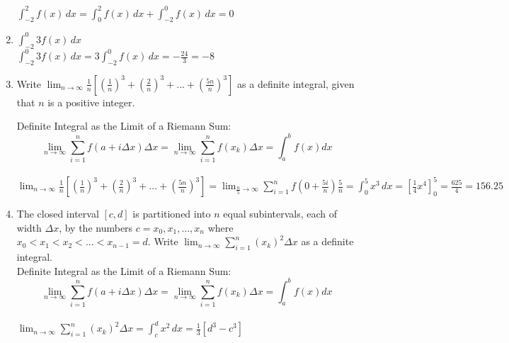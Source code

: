 \documentclass[10pt, letterpaper]{report}
\begin{document}
\begin{enumerate}
    $\int_{-2}^{2}{f(x)}\,dx=\int_{0}^{2}{f(x)}\,dx+\int_{-2}^{0}{f(x)}\,dx=0$ \\

  \item{$\int_{-2}^{0}{3f(x)}\,dx$} \\

    $\int_{-2}^{0}{3f(x)}\,dx=3\int_{-2}^{0}{f(x)}\,dx=-\frac{24}{3}=-8$ \\

\hline
  \item{Write $\lim_{n\to\infty}\frac{1}{n}[(\frac{1}{n})^{3}+(\frac{2}{n})^{3}+...+(\frac{5n}{n})^{3}]$ as a definite integral, given that $n$ is a positive integer.} \\

    \par Definite Integral as the Limit of a Riemann Sum: \\

    \[ \lim_{n\to\infty}\sum_{i=1}^{n}f(a+i\Delta x)\Delta x=\lim_{n\to\infty}\sum_{i=1}^{n}f(x_{k})\Delta x=\int_{a}^{b}f(x)dx \] \\

    $\lim_{n\to\infty}\frac{1}{n}[(\frac{1}{n})^{3}+(\frac{2}{n})^{3}+...+(\frac{5n}{n})^{3}]
    =\lim_{\frac{n}{5}\to\infty}\sum_{i=1}^{n}f(0+\frac{5i}{n})\frac{5}{n}=
    \int_{0}^{5}{x^{3}}\,dx=
    [\frac{1}{4}x^{4}]_{0}^{5}=\frac{625}{4}=156.25$ \\

  \item{The closed interval $[c,d]$ is partitioned into $n$ equal subintervals, each of width $\Delta x$, by the numbers $c=x_{0}, x_{1}, ..., x_{n}$ where $x_{0}<x_{1}<x_{2}<...<x_{n-1}=d$. Write $\lim_{n\to\infty}\sum_{i=1}^{n}(x_{k})^{2}\Delta x$ as a definite integral.} \\

    Definite Integral as the Limit of a Riemann Sum: \\
    \[ \lim_{n\to\infty}\sum_{i=1}^{n}f(a+i\Delta x)\Delta x=\lim_{n\to\infty}\sum_{i=1}^{n}f(x_{k})\Delta x=\int_{a}^{b}f(x)dx \] \\

    $\lim_{n\to\infty}\sum_{i=1}^{n}(x_{k})^{2}\Delta x=\int_{c}^{d}{x^{2}}\,dx=
    \frac{1}{3}[d^{3}-c^{3}]$
\end{enumerate}
\end{document}
